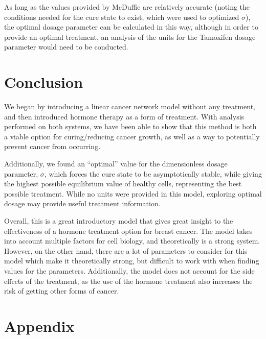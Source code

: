 \documentclass[12pt]{article}
\begin{document}
As long as the values provided by McDuffie are relatively accurate (noting the conditions needed for the cure state to exist, which were used to optimized \(\sigma\)), the optimal dosage parameter can be calculated in this way, although in order to provide an optimal treatment, an analysis of the units for the Tamoxifen dosage parameter would need to be conducted.

\section{Conclusion}
\indent\indent We began by introducing a linear cancer network model without any treatment, and then introduced hormone therapy as a form of treatment.  With analysis performed on both systems, we have been able to show that this method is both a viable option for curing/reducing cancer growth, as well as a way to potentially prevent cancer from occurring.

Additionally, we found an ``optimal'' value for the dimensionless dosage parameter, \(\sigma\), which forces the cure state to be asymptotically stable, while giving the highest possible equilibrium value of healthy cells, representing the best possible treatment. While no units were provided in this model, exploring optimal dosage may provide useful treatment information.

Overall, this is a great introductory model that gives great insight to the effectiveness of a hormone treatment option for breast cancer. The model takes into account multiple factors for cell biology, and theoretically is a strong system. However, on the other hand, there are a lot of parameters to consider for this model which make it theoretically strong, but difficult to work with when finding values for the parameters. Additionally, the model does not account for the side effects of the treatment, as the use of the hormone treatment also increases the risk of getting other forms of cancer. 




\section*{Appendix}
\end{document}
